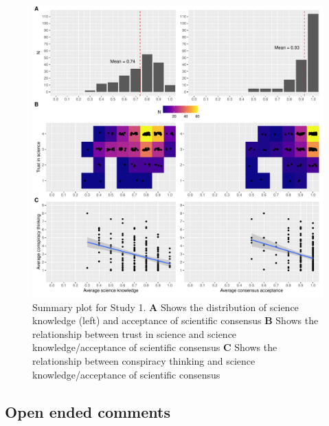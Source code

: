 \documentclass[
  doc,floatsintext]{apa6}
\begin{document}
\begin{figure}
\centering
\includegraphics{output/figures/exp1-plot-overview.pdf}
\caption{\label{fig:exp1-plot-overview}Summary plot for Study 1. \textbf{A} Shows the distribution of science knowledge (left) and acceptance of scientific consensus \textbf{B} Shows the relationship between trust in science and science knowledge/acceptance of scientific consensus \textbf{C} Shows the relationship between conspiracy thinking and science knowledge/acceptance of scientific consensus}
\end{figure}

\subsection{Open ended comments}\label{open-ended-comments}
\end{document}
